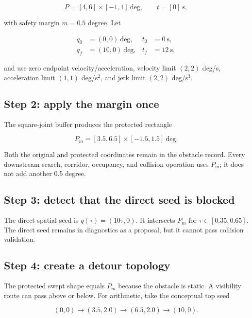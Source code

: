 \documentclass[10pt,letterpaper]{article}
\begin{document}
\begin{equation}
P=[4,6]\times[-1,1]\ \mathrm{deg},\qquad t=[0]\ \mathrm{s},
\end{equation}

with safety margin $m=0.5$ degree. Let

\begin{align*}
q_0&=(0,0)\ \mathrm{deg}, & t_0&=0\ \mathrm{s},\\
q_f&=(10,0)\ \mathrm{deg},& t_f&=12\ \mathrm{s},
\end{align*}

and use zero endpoint velocity/acceleration, velocity limit
$(2,2)$ deg/s, acceleration limit $(1,1)$ deg/s$^2$, and jerk limit
$(2,2)$ deg/s$^3$.

\subsection{Step 2: apply the margin once}

The square-joint buffer produces the protected rectangle

\begin{equation}
P_m=[3.5,6.5]\times[-1.5,1.5]\ \mathrm{deg}.
\end{equation}

Both the original and protected coordinates remain in the obstacle record.
Every downstream search, corridor, occupancy, and collision operation uses
$P_m$; it does not add another 0.5 degree.

\subsection{Step 3: detect that the direct seed is blocked}

The direct spatial seed is $q(\tau)=(10\tau,0)$. It intersects $P_m$ for
$\tau\in[0.35,0.65]$. The direct seed remains in diagnostics as a proposal, but
it cannot pass collision validation.

\subsection{Step 4: create a detour topology}

The protected swept shape equals $P_m$ because the obstacle is static. A
visibility route can pass above or below. For arithmetic, take the conceptual
top seed

\begin{equation}
(0,0)\rightarrow(3.5,2.0)\rightarrow(6.5,2.0)\rightarrow(10,0).
\end{equation}
\end{document}
